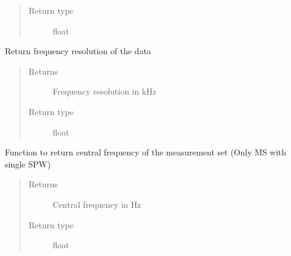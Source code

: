 \documentclass[letterpaper,10pt,english]{sphinxmanual}
\begin{document}
\begin{fulllineitems}
\begin{fulllineitems}
\begin{quote}
\begin{description}
\item[{Return type}] \leavevmode
\sphinxAtStartPar
float

\end{description}\end{quote}

\end{fulllineitems}


\begin{fulllineitems}
\label{\detokenize{paircars:paircars.access_ms.AccessMS.calc_freqres}}
\sphinxAtStartPar
Return frequency resolution of the data
\begin{quote}\begin{description}
\item[{Returns}] \leavevmode
\sphinxAtStartPar
Frequency resolution in kHz

\item[{Return type}] \leavevmode
\sphinxAtStartPar
float

\end{description}\end{quote}

\end{fulllineitems}


\begin{fulllineitems}
\label{\detokenize{paircars:paircars.access_ms.AccessMS.calc_meanfreq}}
\sphinxAtStartPar
Function to return central frequency of the measurement set (Only MS with single SPW)
\begin{quote}\begin{description}
\item[{Returns}] \leavevmode
\sphinxAtStartPar
Central frequency in Hz

\item[{Return type}] \leavevmode
\sphinxAtStartPar
float

\end{description}\end{quote}

\end{fulllineitems}


\end{fulllineitems}
\end{document}
